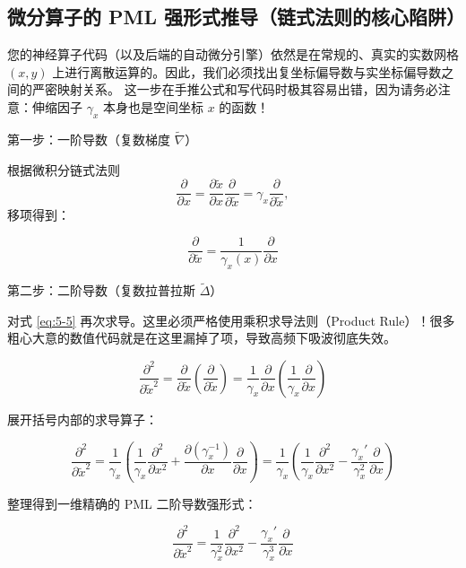 \documentclass[12pt]{article}
\begin{document}
{\subsection{微分算子的 PML 强形式推导（链式法则的核心陷阱）}

您的神经算子代码（以及后端的自动微分引擎）依然是在常规的、真实的实数网格 $(x, y)$ 上进行离散运算的。因此，我们必须找出复坐标偏导数与实坐标偏导数之间的严密映射关系。
这一步在手推公式和写代码时极其容易出错，因为请务必注意：伸缩因子 $\gamma_x$ 本身也是空间坐标 $x$ 的函数！

第一步：一阶导数（复数梯度 $\tilde{\nabla}$）

根据微积分链式法则
\[
\frac{\partial}{\partial x}
=
\frac{\partial \tilde{x}}{\partial x}
\frac{\partial}{\partial \tilde{x}}
=
\gamma_x
\frac{\partial}{\partial \tilde{x}},
\]
移项得到：

\begin{equation}
\frac{\partial}{\partial \tilde{x}} = \frac{1}{\gamma_x(x)} \frac{\partial}{\partial x}
\label{eq:5-5}
\end{equation}

第二步：二阶导数（复数拉普拉斯 $\tilde{\Delta}$）

对式 \eqref{eq:5-5} 再次求导。这里必须严格使用乘积求导法则（Product Rule）！很多粗心大意的数值代码就是在这里漏掉了项，导致高频下吸波彻底失效。

\begin{equation}
\frac{\partial^2}{\partial \tilde{x}^2}
=
\frac{\partial}{\partial \tilde{x}}
\left(
\frac{\partial}{\partial \tilde{x}}
\right)
=
\frac{1}{\gamma_x}
\frac{\partial}{\partial x}
\left(
\frac{1}{\gamma_x}
\frac{\partial}{\partial x}
\right)
\label{eq:5-second-start}
\end{equation}

展开括号内部的求导算子：

\begin{equation}
\frac{\partial^2}{\partial \tilde{x}^2}
=
\frac{1}{\gamma_x}
\left(
\frac{1}{\gamma_x}
\frac{\partial^2}{\partial x^2}
+
\frac{\partial (\gamma_x^{-1})}{\partial x}
\frac{\partial}{\partial x}
\right)
=
\frac{1}{\gamma_x}
\left(
\frac{1}{\gamma_x}
\frac{\partial^2}{\partial x^2}
-
\frac{\gamma_x'}{\gamma_x^2}
\frac{\partial}{\partial x}
\right)
\label{eq:5-second-expand}
\end{equation}

整理得到一维精确的 PML 二阶导数强形式：

\begin{equation}
\frac{\partial^2}{\partial \tilde{x}^2}
=
\frac{1}{\gamma_x^2}
\frac{\partial^2}{\partial x^2}
-
\frac{\gamma_x'}{\gamma_x^3}
\frac{\partial}{\partial x}
\label{eq:5-6}
\end{equation}

}
\end{document}

